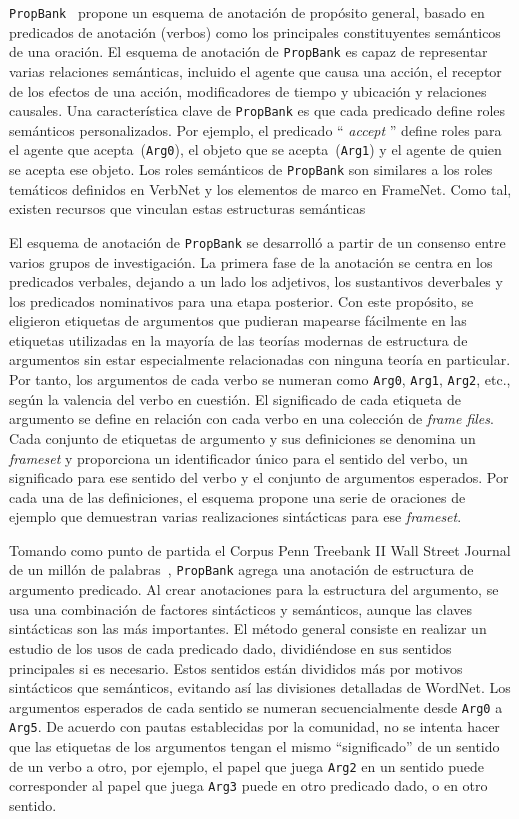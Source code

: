 \texttt{PropBank}~\cite{propbank} propone un esquema de anotación de propósito general, basado en predicados de anotación (verbos) como los principales constituyentes semánticos de una oración.
El esquema de anotación de \texttt{PropBank} es capaz de representar varias relaciones semánticas, incluido el agente que causa una acción, el receptor de los efectos de una acción, modificadores de tiempo y ubicación y relaciones causales.
Una característica clave de \texttt{PropBank} es que cada predicado define roles semánticos personalizados.
Por ejemplo, el predicado `` \textit{accept} '' define roles para el agente que acepta~(\texttt{Arg0}), el objeto que se acepta~(\texttt{Arg1}) y el agente de quien se acepta ese objeto.
Los roles semánticos de \texttt{PropBank} son similares a los roles temáticos definidos en VerbNet y los elementos de marco en FrameNet. Como tal, existen recursos que vinculan estas estructuras semánticas~\cite{semlink}

El esquema de anotación de \texttt{PropBank} se desarrolló a partir de un consenso entre varios grupos de investigación.
La primera fase de la anotación se centra en los predicados verbales, dejando a un lado los adjetivos, los sustantivos deverbales y los predicados nominativos para una etapa posterior.
Con este propósito, se eligieron etiquetas de argumentos que pudieran mapearse fácilmente en las etiquetas utilizadas en la mayoría de las teorías modernas de estructura de argumentos sin estar especialmente relacionadas con ninguna teoría en particular.
Por tanto, los argumentos de cada verbo se numeran como \texttt{Arg0}, \texttt{Arg1}, \texttt{Arg2}, etc., según la valencia del verbo en cuestión.
El significado de cada etiqueta de argumento se define en relación con cada verbo en una colección de \textit{frame files}.
Cada conjunto de etiquetas de argumento y sus definiciones se denomina un \textit{frameset} y proporciona un identificador único para el sentido del verbo, un significado para ese sentido del verbo y el conjunto de argumentos esperados.
Por cada una de las definiciones, el esquema propone una serie de oraciones de ejemplo que demuestran varias realizaciones sintácticas para ese \textit{frameset}.

Tomando como punto de partida el Corpus Penn Treebank II Wall Street Journal de un millón de palabras~\cite{marcus1994penn}, \texttt{PropBank} agrega una anotación de estructura de argumento predicado.
Al crear anotaciones para la estructura del argumento, se usa una combinación de factores sintácticos y semánticos, aunque las claves sintácticas son las más importantes.
El método general consiste en realizar un estudio de los usos de cada predicado dado, dividiéndose en sus sentidos principales si es necesario.
Estos sentidos están divididos más por motivos sintácticos que semánticos, evitando así las divisiones detalladas de WordNet.
Los argumentos esperados de cada sentido se numeran secuencialmente desde \texttt{Arg0} a \texttt{Arg5}.
De acuerdo con pautas establecidas por la comunidad, no se intenta hacer que las etiquetas de los argumentos tengan el mismo ``significado'' de un sentido de un verbo a otro, por ejemplo, el papel que juega \texttt{Arg2} en un sentido puede corresponder al papel que juega \texttt{Arg3} puede en otro predicado dado, o en otro sentido.

